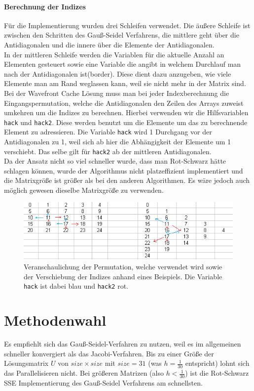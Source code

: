 \documentclass{article}
\begin{document}
\paragraph{Berechnung der Indizes}
Für die Implementierung wurden drei Schleifen verwendet. Die äußere Schleife ist zwischen den Schritten des Gauß-Seidel Verfahrens, die mittlere geht über die Antidiagonalen und die innere über die Elemente der Antidiagonalen. \\
In der mittleren Schleife werden die Variablen für die aktuelle Anzahl an Elementen gesteuert sowie eine Variable die angibt in welchem Durchlauf man nach der Antidiagonalen ist(border). Diese dient dazu anzugeben, wie viele Elemente man am Rand weglassen kann, weil sie nicht mehr in der Matrix sind.\\
Bei der Wavefront Cache Lösung muss man bei jeder Indexberechnung die Eingangspermutation, welche die Antidiagonalen den Zeilen des Arrays zuweist umkehren um die Indizes zu berechnen. Hierbei verwenden wir die Hilfsvariablen \texttt{hack} und \texttt{hack2}. Diese werden benutzt um die Elemente um das zu berechnende Element zu adressieren. Die Variable \texttt{hack} wird 1 Durchgang vor der Antidiagonalen zu 1, weil sich ab hier die Abhängigkeit der Elemente um 1 verschiebt. Das selbe gilt für \texttt{hack2} ab der mittleren Antidiagonalen. \\
Da der Ansatz nicht so viel schneller wurde, dass man Rot-Schwarz hätte schlagen können, wurde der Algorithmus nicht platzeffizient implementiert und die Matrixgröße ist größer als bei den anderen Algorithmen. Es wäre jedoch auch möglich gewesen dieselbe Matrixgröße zu verwenden.

\begin{figure}[h] 
  \centering
     \includegraphics[width=1\textwidth]{bilder/hack.png}
  \caption{Veranschaulichung der Permutation, welche verwendet wird sowie der Verschiebung der Indizes anhand eines Beispiels. Die Variable \texttt{hack} ist dabei blau und \texttt{hack2} rot.}
  \label{fig:Bild6}
\end{figure}

\section{Methodenwahl}
Es empfiehlt sich das Gauß-Seidel-Verfahren zu nutzen, weil es im allgemeinen schneller konvergiert als das Jacobi-Verfahren. Bis zu einer Größe der Lösungsmatrix $U$ von $size \times size$ mit $size = 31$ (was $h=\frac{1}{30}$ entspricht) lohnt sich das Parallelisieren nicht. Bei größeren Matrizen (also $h < \frac{1}{30}$) ist die Rot-Schwarz SSE Implementierung des Gauß-Seidel Verfahrens am schnellsten.
\end{document}
